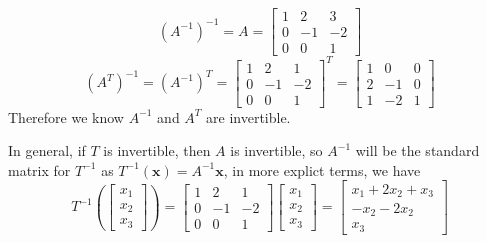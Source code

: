 \documentclass{beamer}
\theoremstyle{definition}
\theoremstyle{remark}
\begin{document}
\begin{frame}[t]
\begin{solution}
\[
(A^{-1})^{-1}=A=\begin{bmatrix}
1&2&3\\
0&-1&-2\\
0&0&1
\end{bmatrix}
\]\pause
\[
(A^T)^{-1}=(A^{-1})^T=\begin{bmatrix}
1&2&1\\
0&-1&-2\\
0&0&1
\end{bmatrix}^T=\begin{bmatrix}
1&0&0\\
2&-1&0\\
1&-2&1
\end{bmatrix}
\]\pause
Therefore we know $A^{-1}$ and $A^T$ are invertible.\pause

In general, if $T$ is invertible, then $A$ is invertible, so $A^{-1}$ will be the standard matrix for $T^{-1}$ as $T^{-1}(\mathbf x)=A^{-1}\mathbf x$, in more explict terms, we have\pause
\[
T^{-1}\left(\begin{bmatrix}
x_1\\x_2\\x_3
\end{bmatrix}\right)=\begin{bmatrix}
1&2&1\\
0&-1&-2\\
0&0&1
\end{bmatrix}\begin{bmatrix}
x_1\\x_2\\x_3
\end{bmatrix}=\begin{bmatrix}
x_1+2x_2+x_3\\-x_2-2x_2\\x_3
\end{bmatrix}
\]
\end{solution}
\end{frame}

\end{document}
